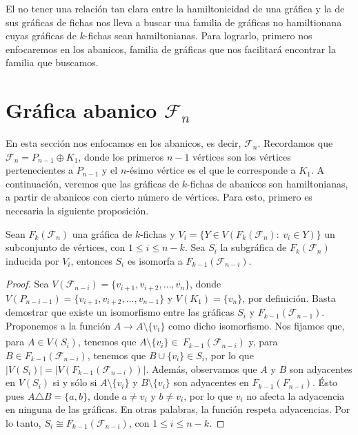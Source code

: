 El no tener una relaci\'on tan clara entre la hamiltonicidad de una gr\'afica y
la de sus gr\'aficas de fichas nos lleva a buscar una familia de gr\'aficas no
hamiltionana cuyas gr\'aficas de $k$-fichas sean hamiltonianas. Para lograrlo,
primero nos enfocaremos en los abanicos, familia de gr\'aficas que nos
facilitar\'a encontrar la familia que buscamos.

\section{Gr\'afica abanico \texorpdfstring{$\mathcal{F}_n$}{Fn}}%
\label{sec:SimpleFan}

En esta secci\'on nos enfocamos en los abanicos, es decir, $\mathcal{F}_n$.
Recordamos que $\mathcal{F}_n = P_{n-1} \oplus K_1$, donde los primeros $n-1$
v\'ertices son los v\'ertices pertenecientes a $P_{n-1}$ y el $n$-\'esimo
v\'ertice es el que le corresponde a $K_1$. A continuaci\'on, veremos que las
gr\'aficas de $k$-fichas de abanicos son hamiltonianas, a partir de abanicos con
cierto n\'umero de v\'ertices. Para esto, primero es necesaria la siguiente
proposici\'on.

\begin{proposicion}
\label{prop:iso-SFan}
    Sean $F_k(\mathcal{F}_n)$ una gr\'afica de $k$-fichas y $V_i=\{ Y \in
    V(F_k(\mathcal{F}_n) \colon\ v_i \in Y) \}$ un subconjunto de v\'ertices,
    con $1 \leq i \leq n-k$. Sea $S_i$ la subgr\'afica de $F_k(\mathcal{F}_n)$
    inducida  por $V_i$, entonces $S_i$ es isomorfa a
    $F_{k-1}(\mathcal{F}_{n-i})$.
\end{proposicion}
    
\begin{proof}
    Sea $V(\mathcal{F}_{n-i}) = \{v_{i+1}, v_{i+2}, \dots, v_n\}$, donde
    $V(P_{n-i-1}) = \{v_{i+1}, v_{i+2}, \dots, v_{n-1}\}$ y $V(K_1)= \{v_n\}$,
    por definici\'on. Basta demostrar que existe un isomorfismo entre las
    gr\'aficas $S_i$ y $F_{k-1}(\mathcal{F}_{n-1})$. Proponemos a la funci\'on
    $A \xrightarrow[]{} A \setminus \{v_i\}$ como dicho isomorfismo. Nos fijamos
    que, para $A \in V(S_i)$, tenemos que $A \setminus \{v_i\} \in \
    F_{k-1}(\mathcal{F}_{n-i})$ y, para $B \in F_{k-1}(\mathcal{F}_{n-i})$,
    tenemos que $B \cup \{v_i\} \in S_i$, por lo que
    $|V(S_i)|=|V(F_{k-1}(\mathcal{F}_{n-i}))|$. Adem\'as, observamos que $A$ y
    $B $ son adyacentes en $V(S_i)$ si y s\'olo si $A \setminus \{v_i\}$ y $B
    \setminus \{v_i\}$ son adyacentes en $F_{k-1}(F_{n-i})$. \'Esto pues
    $A\triangle B = \{a,b\}$, donde $a\neq v_i$ y $b \neq v_i$, por lo que $v_i$
    no afecta la adyacencia en ninguna de las gr\'aficas. En otras palabras, la
    funci\'on respeta adyacencias. Por lo tanto, $S_i \cong
    F_{k-1}(\mathcal{F}_{n-i})$, con $1 \leq i \leq n-k$.
\end{proof}


